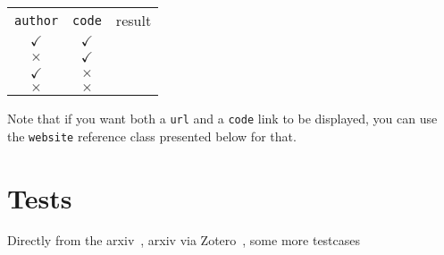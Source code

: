 \documentclass[a4paper,twocolumn,11pt]{quantumarticle}
\begin{document}
	\begin{tabular}{ccc}
		\texttt{author} & \texttt{code} & result \\
		$\checkmark$ & $\checkmark$ &\citeweb{web_author_code} \\
		$\times$ & $\checkmark$ &\citeweb{web_code} \\
		$\checkmark$ & $\times$ &\citeweb{web_author} \\
		$\times$ & $\times$ &\citeweb{web} \\
	\end{tabular}
	
	Note that if you want both a \texttt{url} and a \texttt{code} link to be displayed, you can use the \texttt{website} reference class presented below for that.
	
	
	\section{Tests}
	Directly from the arxiv~, arxiv via Zotero~, some more testcases~
	
	
\end{document}
